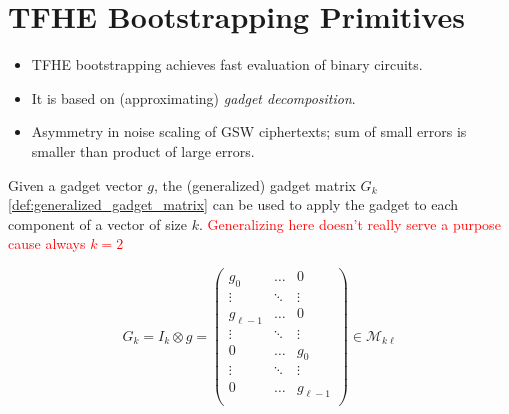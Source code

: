 \section{TFHE Bootstrapping Primitives}
\begin{itemize}
    \item TFHE bootstrapping achieves fast evaluation of binary circuits. 
    \item It is based on (approximating) \textit{gadget decomposition}. 
    \item Asymmetry in noise scaling of GSW ciphertexts; sum of small errors is smaller than product of large errors.
\end{itemize}

\ifnotes
\begin{definition}
    Given a gadget vector $g$, the (generalized) gadget matrix $G_k$ \eqref{def:generalized_gadget_matrix} can be used to apply the gadget to each component of a vector of size $k$. \textcolor{red}{Generalizing here doesn't really serve a purpose cause always $k = 2$}
    
    \begin{equation}
        \label{def:generalized_gadget_matrix}
        G_k = I_k \otimes g = 
        \left(
        \begin{array}{c|c|c}
            g_0 & \dots & 0 \\
            \vdots & \ddots & \vdots \\
            g_{\ell - 1} & \dots & 0 \\
            \hline 
            \vdots & \ddots & \vdots \\ 
            \hline
            0 & \dots & g_0 \\
            \vdots & \ddots & \vdots \\
            0 & \dots & g_{\ell - 1} \\
        \end{array}
        \right)
        \in \mathcal{M}_{k\ell}
    \end{equation}    
\end{definition}
\fi

